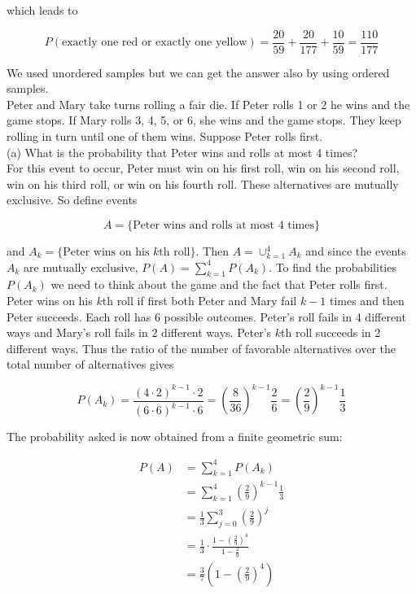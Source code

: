         which leads to

        \[
            P(\text{exactly one red or exactly one yellow}) = \frac{20}{59} + \frac{20}{177} + \frac{10}{59} = \frac{110}{177}
        \]

        We used unordered samples but we can get the answer also by using ordered samples. \\

        \textit{} Peter and Mary take turns rolling a fair die. If Peter rolls 1 or 2 he wins and the game stops. If Mary rolls 3, 4, 5, or 6, she wins and the game stops. They keep rolling in turn
        until one of them wins. Suppose Peter rolls first. \\

        (a) What is the probability that Peter wins and rolls at most 4 times? \\

        For this event to occur, Peter must win on his first roll, win on his second roll, win on his third roll, or win on his fourth roll. These alternatives are mutually exclusive. So define events

        \[
            A = \{\text{Peter wins and rolls at most 4 times}\}
        \]

        and $A_k = \{\text{Peter wins on his $k$th roll}\}$. Then $A = \cup^4_{k=1} A_k$ and since the events $A_k$ are mutually exclusive, $P(A) = \sum^4_{k=1} P(A_k)$. To find the probabilities $P(A_k)$ we need to think
        about the game and the fact that Peter rolls first. Peter wins on his $k$th roll if first both Peter and Mary fail $k-1$ times and then Peter succeeds. Each roll has 6 possible outcomes. Peter's roll fails in 4
        different ways and Mary's roll fails in 2 different ways. Peter's $k$th roll succeeds in 2 different ways. Thus the ratio of the number of favorable alternatives over the total number of alternatives gives

        \[
            P(A_k) = \frac{(4\cdot 2)^{k-1} \cdot 2}{(6\cdot 6)^{k-1}\cdot 6} = \left(\frac{8}{36}\right)^{k-1} \frac{2}{6} = \left(\frac{2}{9}\right)^{k-1} \frac{1}{3}
        \]

        The probability asked is now obtained from a finite geometric sum:

        \begin{align*}
            P(A)    &= \sum^4_{k=1} P(A_k) \\
                    &= \sum^4_{k=1} \left(\frac{2}{9}\right)^{k-1} \frac{1}{3} \\
                    &= \frac{1}{3}\sum^3_{j=0} \left(\frac{2}{9}\right)^j \\
                    &= \frac{1}{3}\cdot \frac{1-\left(\frac{2}{9}\right)^4}{1-\frac{2}{9}} \\
                    &= \frac{3}{7}\left(1-\left(\frac{2}{9}\right)^4\right)
        \end{align*}

